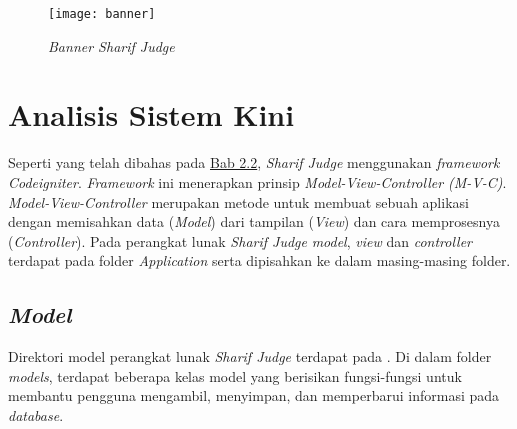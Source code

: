 \begin{figure}[H]
	\centering  
	\texttt{[image: banner]}  
	\caption[\textit{Banner Sharif Judge}]{\textit{Banner Sharif Judge}} 
	\label{fig:banner} 
\end{figure} 

\section{Analisis Sistem Kini}

Seperti yang telah dibahas pada \hyperref[sec:sharifjudge]{Bab 2.2}, \textit{\textit{Sharif Judge}} menggunakan\textit{ framework Codeigniter}. \textit{Framework} ini menerapkan prinsip \textit{Model-View-Controller (M-V-C)}. \textit{Model-View-Controller} merupakan metode untuk membuat sebuah aplikasi dengan memisahkan data (\textit{Model}) dari tampilan (\textit{View}) dan cara memprosesnya (\textit{Controller}). Pada perangkat lunak \textit{Sharif Judge} \textit{model}, \textit{view} dan \textit{controller} terdapat pada folder \textit{Application} serta dipisahkan ke dalam masing-masing folder.  

\subsection{\textit{Model}}
Direktori model perangkat lunak \textit{Sharif Judge} terdapat pada . Di dalam folder \textit{models}, terdapat beberapa kelas model yang berisikan fungsi-fungsi untuk membantu pengguna mengambil, menyimpan, dan memperbarui informasi pada \textit{database}.

